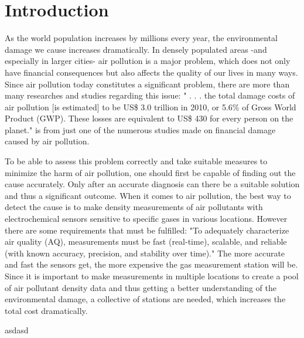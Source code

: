 \chapter{Introduction}
\label{sec:introduction}


As the world population increases by millions every year, the environmental damage we cause increases dramatically. In densely populated areas -and especially in larger cities- air pollution is a major problem, which does not only have financial consequences but also affects the quality of our lives in many ways. Since air pollution today constitutes a significant problem, there are more than many researches and studies regarding this issue: " . . . the total damage costs of air pollution [is estimated] to be US\$ 3.0 trillion in 2010, or 5.6\% of Gross World Product (GWP). These losses are equivalent to US\$ 430 for every person on the planet."\cite{Hutton2011} is from just one of the numerous studies made on financial damage caused by air pollution.\par
To be able to assess this problem correctly and take suitable measures to minimize the harm of air pollution, one should first be capable of finding out the cause accurately. Only after an accurate diagnosis can there be a suitable solution and thus a significant outcome. When it comes to air pollution, the best way to detect the cause is to make density measurements of air pollutants with electrochemical sensors sensitive to specific gases in various locations. However there are some requirements that must be fulfilled: "To adequately characterize air quality (AQ), measurements must be fast (real-time), scalable, and reliable (with known accuracy, precision, and stability over time)."\cite{Cross2017} The more accurate and fast the sensors get, the more expensive the gas measurement station will be. Since it is important to make measurements in multiple locations to create a pool of air pollutant density data and thus getting a better understanding of the environmental damage, a collective of stations are needed, which increases the total cost dramatically.\par





asdasd%
